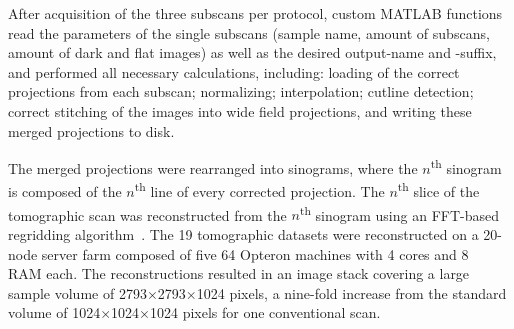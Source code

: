 After acquisition of the three subscans per protocol, custom MATLAB functions read the parameters of the single subscans (\eg sample name, amount of subscans, amount of dark and flat images) as well as the desired output-name and -suffix, and performed all necessary calculations, including: loading of the correct projections from each subscan; normalizing; interpolation; cutline detection; correct stitching of the images into wide field projections, and writing these merged projections to disk.

The merged projections were rearranged into sinograms, where the $n$\textsuperscript{th} sinogram is composed of the $n$\textsuperscript{th} line of every corrected projection. The $n$\textsuperscript{th} slice of the tomographic scan was reconstructed from the $n$\textsuperscript{th} sinogram using an FFT-based regridding algorithm~\cite{Dowd1999}. The 19 tomographic datasets were reconstructed on a 20-node server farm composed of five \SI{64}{\bit} Opteron machines with 4 cores and \SI{8}{\giga\byte} RAM each. The reconstructions resulted in an image stack covering a large sample volume of 2793$\times$2793$\times$1024 pixels, a nine-fold increase from the standard volume of 1024$\times$1024$\times$1024 pixels for one conventional scan.